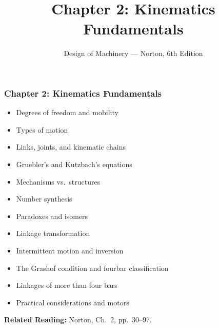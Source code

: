 \documentclass[10pt,aspectratio=43]{beamer}
\title{Chapter 2: Kinematics Fundamentals}
\subtitle{Design of Machinery --- Norton, 6th Edition}
\author{}
\date{}
\begin{document}

\begin{frame}
\frametitle{Chapter 2: Kinematics Fundamentals}

\begin{itemize}
  \item Degrees of freedom and mobility
  \item Types of motion
  \item Links, joints, and kinematic chains
  \item Gruebler's and Kutzbach's equations
  \item Mechanisms vs.\ structures
  \item Number synthesis
  \item Paradoxes and isomers
  \item Linkage transformation
  \item Intermittent motion and inversion
  \item The Grashof condition and fourbar classification
  \item Linkages of more than four bars
  \item Practical considerations and motors
\end{itemize}

\vspace{4pt}
\textbf{Related Reading:} Norton, Ch.~2, pp.~30--97.
\end{frame}

\end{document}
